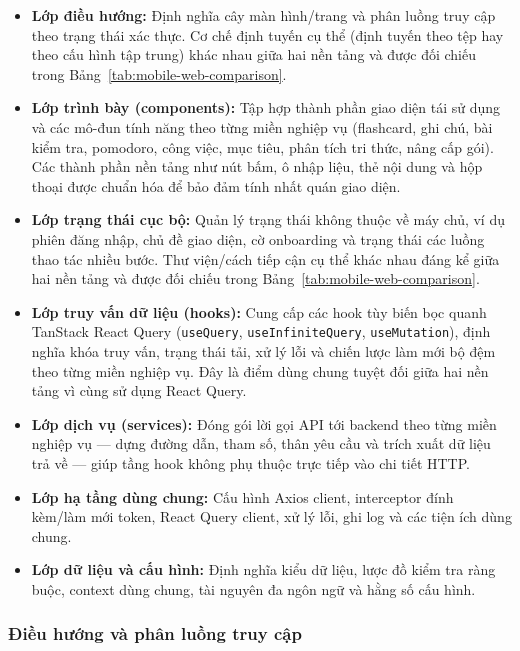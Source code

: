 \begin{itemize}
    \item \textbf{Lớp điều hướng:} Định nghĩa cây màn hình/trang và phân luồng truy cập theo trạng thái xác thực. Cơ chế định tuyến cụ thể (định tuyến theo tệp hay theo cấu hình tập trung) khác nhau giữa hai nền tảng và được đối chiếu trong Bảng~\ref{tab:mobile-web-comparison}.
    \item \textbf{Lớp trình bày (components):} Tập hợp thành phần giao diện tái sử dụng và các mô-đun tính năng theo từng miền nghiệp vụ (flashcard, ghi chú, bài kiểm tra, pomodoro, công việc, mục tiêu, phân tích tri thức, nâng cấp gói). Các thành phần nền tảng như nút bấm, ô nhập liệu, thẻ nội dung và hộp thoại được chuẩn hóa để bảo đảm tính nhất quán giao diện.
    \item \textbf{Lớp trạng thái cục bộ:} Quản lý trạng thái không thuộc về máy chủ, ví dụ phiên đăng nhập, chủ đề giao diện, cờ onboarding và trạng thái các luồng thao tác nhiều bước. Thư viện/cách tiếp cận cụ thể khác nhau đáng kể giữa hai nền tảng và được đối chiếu trong Bảng~\ref{tab:mobile-web-comparison}.
    \item \textbf{Lớp truy vấn dữ liệu (hooks):} Cung cấp các hook tùy biến bọc quanh TanStack React Query (\texttt{useQuery}, \texttt{useInfiniteQuery}, \texttt{useMutation}), định nghĩa khóa truy vấn, trạng thái tải, xử lý lỗi và chiến lược làm mới bộ đệm theo từng miền nghiệp vụ. Đây là điểm dùng chung tuyệt đối giữa hai nền tảng vì cùng sử dụng React Query.
    \item \textbf{Lớp dịch vụ (services):} Đóng gói lời gọi API tới backend theo từng miền nghiệp vụ — dựng đường dẫn, tham số, thân yêu cầu và trích xuất dữ liệu trả về — giúp tầng hook không phụ thuộc trực tiếp vào chi tiết HTTP.
    \item \textbf{Lớp hạ tầng dùng chung:} Cấu hình Axios client, interceptor đính kèm/làm mới token, React Query client, xử lý lỗi, ghi log và các tiện ích dùng chung.
    \item \textbf{Lớp dữ liệu và cấu hình:} Định nghĩa kiểu dữ liệu, lược đồ kiểm tra ràng buộc, context dùng chung, tài nguyên đa ngôn ngữ và hằng số cấu hình.
\end{itemize}

\subsubsection{Điều hướng và phân luồng truy cập}
\label{subsubsec:frontend-navigation}

